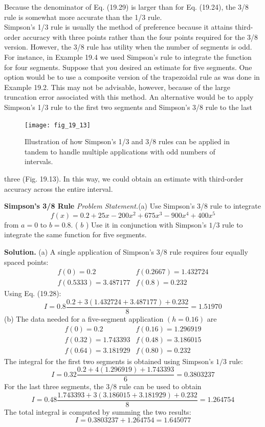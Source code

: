 \documentclass[../main.tex]{subfiles}
\begin{document}
Because the denominator of Eq. (19.29) is larger than for Eq. (19.24), the 3/8 rule is somewhat more accurate than the 1/3 rule.\\

Simpson's 1/3 rule is usually the method of preference because it attains third-order
accuracy with three points rather than the four points required for the 3/8 version. However, the 3/8 rule has utility when the number of segments is odd. For instance, in Example 19.4 we used Simpson's rule to integrate the function for four segments. Suppose that
you desired an estimate for five segments. One option would be to use a composite version
of the trapezoidal rule as was done in Example 19.2. This may not be advisable, however,
because of the large truncation error associated with this method. An alternative would be
to apply Simpson's 1/3 rule to the first two segments and Simpson's 3/8 rule to the last

\begin{figure}[H]
    \centering
    \texttt{[image: fig\_19\_13]}
   \caption{\textsf{Illustration of how Simpson's 1/3 and 3/8 rules can be applied in tandem to handle multiple
   applications with odd numbers of intervals.}}\label{fig:fig_19_13}
\end{figure}
three (Fig. 19.13). In this way, we could obtain an estimate with third-order accuracy across
the entire interval.

\begin{exmp} \textbf{Simpson's 3/8 Rule}
    \noindent\textit{Problem Statement.}(a) Use Simpson's 3/8 rule to integrate
    $$
f(x)=0.2+25 x-200 x^{2}+675 x^{3}-900 x^{4}+400 x^{5}
$$
from $a=0$ to $b=0.8$. ( $b$ ) Use it in conjunction with Simpson's $1 / 3$ rule to integrate the same function for five segments.


	\noindent \textbf{Solution.} (a) A single application of Simpson's $3 / 8$ rule requires four equally spaced points:
	$$
	\begin{array}{ll}
	f(0)=0.2 & f(0.2667)=1.432724 \\
	f(0.5333)=3.487177 & f(0.8)=0.232
	\end{array}
	$$
	Using Eq. (19.28):
	$$
	I=0.8 \frac{0.2+3(1.432724+3.487177)+0.232}{8}=1.51970
	$$
	(b) The data needed for a five-segment application $(h=0.16)$ are
	$$
	\begin{array}{ll}
	f(0)=0.2 & f(0.16)=1.296919 \\
	f(0.32)=1.743393 & f(0.48)=3.186015 \\
	f(0.64)=3.181929 & f(0.80)=0.232
	\end{array}
	$$
	The integral for the first two segments is obtained using Simpson's $1 / 3$ rule:
	$$
	I=0.32 \frac{0.2+4(1.296919)+1.743393}{6}=0.3803237
	$$
	For the last three segments, the $3 / 8$ rule can be used to obtain
	$$
	I=0.48 \frac{1.743393+3(3.186015+3.181929)+0.232}{8}=1.264754
	$$
	The total integral is computed by summing the two results:
	$$
	I=0.3803237+1.264754=1.645077
	$$
\end{exmp}
\end{document}

